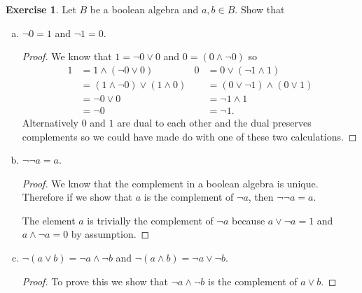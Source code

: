 \documentclass{article}
\theoremstyle{definition}
\newtheorem{question}{Exercise}
\begin{document}
\begin{question}
    Let \(B\) be a boolean algebra and \(a,b\in B\). Show that
    \begin{enumerate}[a)]
        \item \(\neg 0=1\) and \(\neg 1=0\).

              \begin{proof}
                  We know that \(1=\neg 0\vee 0\) and \(0=(0\wedge\neg 0)\) so
                  \begin{align*}
                      1 & =1\wedge(\neg 0\vee 0)           & 0 & =0\vee(\neg 1\wedge 1)        \\
                        & =(1\wedge\neg 0)\vee (1\wedge 0) &   & =(0\vee\neg 1)\wedge(0\vee 1) \\
                        & =\neg 0\vee 0                    &   & =\neg 1\wedge 1               \\
                        & =\neg 0                          &   & =\neg 1.
                  \end{align*}
                  Alternatively \(0\) and \(1\) are dual to each other and the
                  dual preserves complements so we could have made do with one
                  of these two calculations.
              \end{proof}

        \item \(\neg\neg a=a\).

              \begin{proof}
                  We know that the complement in a boolean algebra is unique.
                  Therefore if we show that \(a\) is the complement of \(\neg
                  a\), then \(\neg\neg a=a\).

                  The element \(a\) is trivially the complement of \(\neg a\)
                  because \(a\vee\neg a=1\) and \(a\wedge\neg a=0\) by
                  assumption.
              \end{proof}

        \item \(\neg(a\vee b)=\neg a\wedge\neg b\) and \(\neg(a\wedge b)=\neg
              a\vee \neg b\).

              \begin{proof}
                  To prove this we show that \(\neg a\wedge\neg b\) is the
                  complement of \(a\vee b\).


\end{proof}
\end{enumerate}
\end{question}
\end{document}
